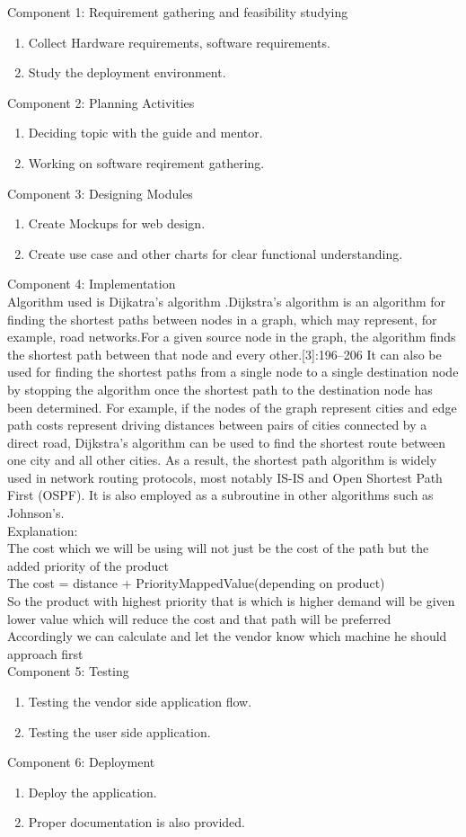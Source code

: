 \documentclass[oneside,a4paper,12pt]{report}
\begin{document}
Component 1: Requirement gathering and feasibility studying
\begin{enumerate}
\item Collect Hardware requirements, software requirements. 
\item Study the deployment environment.
\end{enumerate}
Component 2: Planning Activities
\begin{enumerate}
\item Deciding topic with the guide and mentor. 
\item Working on software reqirement gathering.
\end{enumerate}
Component 3: Designing Modules
\begin{enumerate}
\item Create Mockups for web design. 
\item Create use case and other charts for clear functional understanding.
\end{enumerate}
Component 4: Implementation\\
Algorithm used is Dijkatra's algorithm .Dijkstra's algorithm is an algorithm for finding the shortest paths between nodes in a graph, which may represent, for example, road networks.For a given source node in the graph, the algorithm finds the shortest path between that node and every other.[3]:196–206 It can also be used for finding the shortest paths from a single node to a single destination node by stopping the algorithm once the shortest path to the destination node has been determined. For example, if the nodes of the graph represent cities and edge path costs represent driving distances between pairs of cities connected by a direct road, Dijkstra's algorithm can be used to find the shortest route between one city and all other cities. As a result, the shortest path algorithm is widely used in network routing protocols, most notably IS-IS and Open Shortest Path First (OSPF). It is also employed as a subroutine in other algorithms such as Johnson's.\\
Explanation: \\
The cost which we will be using will not just be the cost of the path but the added priority of the product\\
The cost = distance + PriorityMappedValue(depending on product) \\
So the product with highest priority that is which is higher demand  will be given lower value which will reduce the cost and that path will be preferred\\
Accordingly we can calculate and let the vendor know which machine he should approach first\\ 
Component 5: Testing 
\begin{enumerate}
\item Testing the vendor side application flow.
\item Testing the user side application.
\end{enumerate}
Component 6: Deployment
\begin{enumerate}
\item Deploy the application.
\item Proper documentation is also provided.
\end{enumerate}
\end{document}
